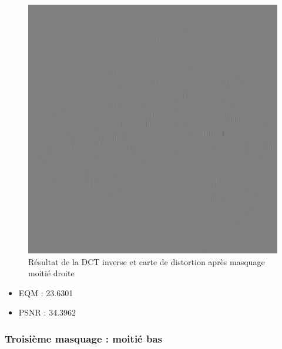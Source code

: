 \documentclass[12pt]{report}
\begin{document}
\begin{figure}[H]
\begin{center}
\includegraphics[scale=0.4]{../ImageRes/idct_masked1_disto.jpg} 
\caption{Résultat de la DCT inverse et carte de distortion après masquage moitié droite}
\end{center}
\end{figure}

\begin{itemize}
\item EQM : 23.6301
\item PSNR : 34.3962
\end{itemize}

\subsubsection{Troisième masquage : moitié bas}
\end{document}

